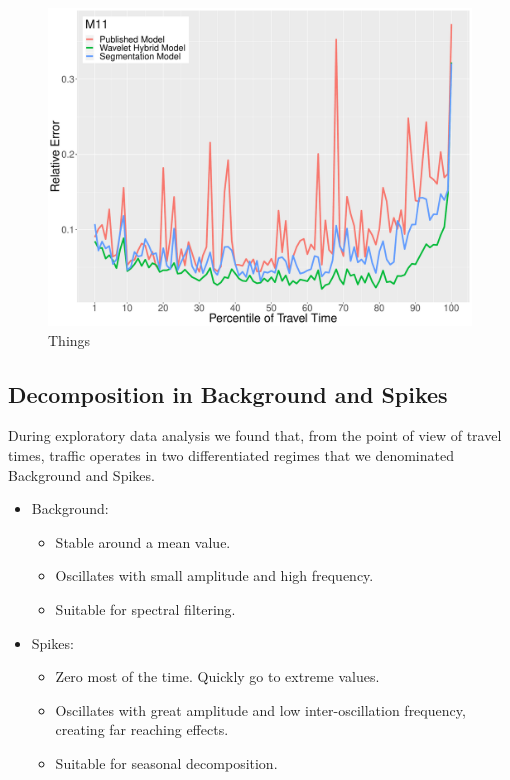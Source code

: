 \documentclass[letterpaper, 10 pt, conference]{ieeeconf}  %
\begin{document}
\begin{figure}[htbp]
	\centerline{\includegraphics[width=\linewidth]{./images/m11_quantile_rms.pdf}}
	\caption{Things}
	\label{fig:m11q}
\end{figure}

\subsection{Decomposition in Background and Spikes}
During exploratory data analysis we found that, from the point of view of travel times, traffic operates in two differentiated regimes that we denominated Background and Spikes. 
\begin{itemize}
	\item Background: 
	\begin{itemize}
		\item Stable around a mean value.
		\item Oscillates with small amplitude and high frequency.
		\item Suitable for spectral filtering.
	\end{itemize}
	\item Spikes: 
	\begin{itemize}
		\item Zero most of the time. Quickly go to extreme values.
		\item Oscillates with great amplitude and low inter-oscillation frequency, creating far reaching effects.
		\item Suitable for seasonal decomposition.
	\end{itemize}
\end{itemize}
\end{document}
